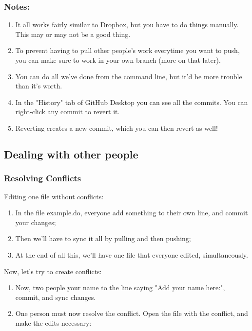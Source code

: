 \documentclass{beamer}
\begin{document}
\begin{frame}
	\frametitle{Notes:}
	\begin{enumerate}
		\item It all works fairly similar to Dropbox, but you have to do things manually. This may or may not be a good thing.
		\item To prevent having to pull other people's work everytime you want to push, you can make sure to work in your own branch (more on that later).
		\item You can do all we've done from the command line, but it'd be more trouble than it's worth.
		\item In the "History" tab of GitHub Desktop you can see all the commits. You can right-click any commit to revert it. 
		\item Reverting creates a new commit, which you can then revert as well!
	\end{enumerate}
\end{frame}

\subsection{Dealing with other people}
\begin{frame}
	\frametitle{Resolving Conflicts}
	Editing one file without conflicts:
	\begin{enumerate}
		\item<2-> In the file example.do, everyone add something to their own line, and commit your changes;
		\item<2-> Then we'll have to sync it all by pulling and then pushing;
		\item<2-> At the end of all this, we'll have one file that everyone edited, simultaneously.
	\end{enumerate}
	Now, let's try to create conflicts:
	\begin{enumerate}
		\item<3-> Now, two people your name to the line saying "Add your name here:", commit, and sync changes.
		\item<3-> One person must now resolve the conflict. Open the file with the conflict, and make the edits necessary:
	\end{enumerate}
	
\end{frame}
\end{document}
